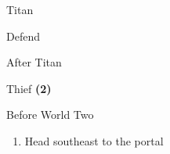 \begin{paracol}{2}
\begin{boss}{Titan}
	\varwb
	\begin{round}{1}
		\lenna Defend
        \faris \leftCommand{\gilToss}
        \bartz \rightCommand{\hide}
        \lenna \leftCommand{\throw} \then \thunderScroll
    \end{round}
	\varwe
\end{boss}

\begin{menu}{After Titan}
    \varwb
    \begin{jobMenu}
        \bartz Thief \textbf{(2\pointRight)} \optimize
    \end{jobMenu}
    \begin{itemMenu}
        \item {}
        \item[] 
    \end{itemMenu}
    \varwe
\end{menu}

\switchcolumn
\begin{steproute}{Before World Two}
\end{steproute}

\switchcolumn
\begin{enumerate}[resume]
    \item Head southeast to the portal
\end{enumerate}

\end{paracol}